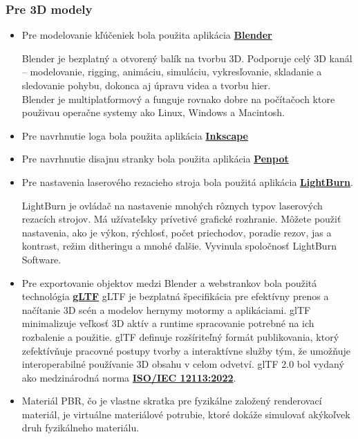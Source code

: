       \subsubsection{Pre 3D modely}
        \begin{itemize}
          \item{
            Pre modelovanie kľúčeniek bola použita aplikácia \textbf{\href{https://www.blender.org/}{Blender}} 
            
            Blender je bezplatný a otvorený balík na tvorbu 3D. Podporuje celý 3D kanál – modelovanie, rigging, animáciu, simuláciu, vykresľovanie, skladanie a sledovanie pohybu, dokonca aj úpravu videa a tvorbu hier. \\
            Blender je multiplatformový a funguje rovnako dobre na počítačoch ktore použivau operačne systemy ako Linux, Windows a Macintosh.
          }
          \item{
              Pre navrhnutie loga bola použita aplikácia \textbf{\href{https://inkscape.org/}{Inkscape}}
          }
          \item{
              Pre navrhnutie disajnu stranky bola použita aplikácia \textbf{\href{https://penpot.app/}{Penpot}}
          }
          \item{
            Pre nastavenia laserového rezacieho stroja bola použitá aplikácia \textbf{\href{https://lightburnsoftware.com/}{LightBurn}}.

            LightBurn je ovládač na nastavenie mnohých rôznych typov laserových rezacích strojov. Má užívateľsky prívetivé grafické rozhranie. Môžete použiť nastavenia, ako je výkon, rýchlosť, počet priechodov, poradie rezov, jas a kontrast, režim ditheringu a mnohé ďalšie. Vyvinula spoločnosť LightBurn Software.
          }
          \item{
            Pre exportovanie objektov medzi Blender a webstrankov bola použitá technológia \textbf{\href{https://www.khronos.org/gltf/}{gLTF}}
            gLTF je bezplatná špecifikácia pre efektívny prenos a načítanie 3D scén a modelov hernymy motormy a aplikáciami. glTF minimalizuje veľkosť 3D aktív a runtime spracovanie potrebné na ich rozbalenie a použitie. glTF definuje rozšíriteľný formát publikovania, ktorý zefektívňuje pracovné postupy tvorby a interaktívne služby tým, že umožňuje interoperabilné používanie 3D obsahu v celom odvetví. glTF 2.0 bol vydaný ako medzinárodná norma \textbf{\href{https://www.iso.org/standard/83990.html}{ISO/IEC 12113:2022}}.
          }
          \item{
            Materiál PBR, čo je vlastne skratka pre fyzikálne založený renderovací materiál, je virtuálne materiálové potrubie, ktoré dokáže simulovať akýkoľvek druh fyzikálneho materiálu.
          }
        \end{itemize}

